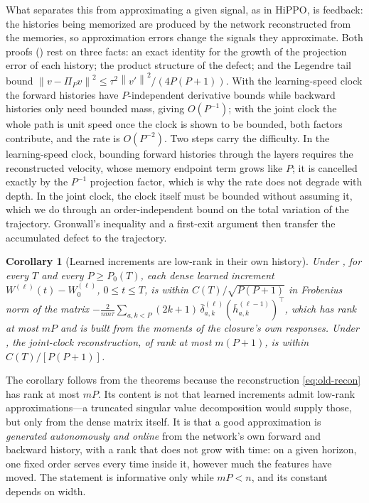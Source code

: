 \documentclass[11pt]{article}
\newtheorem{corollary}[theorem]{Corollary}
\theoremstyle{definition}
\theoremstyle{remark}
\newcommand{\norm}[1]{\left\lVert #1\right\rVert}
\begin{document}
What separates this from approximating a given signal, as in HiPPO, is feedback:
the histories being memorized are produced by the network reconstructed from
the memories, so approximation errors change the signals they approximate.  Both
proofs () rest on three facts: an exact
identity for the growth of the projection error of each history; the product
structure of the defect; and the Legendre tail bound
$\norm{v-\Pi_Pv}^2\le\tau^2\norm{v'}^2/(4P(P+1))$.  With the learning-speed clock
the forward histories have $P$-independent derivative bounds while backward
histories only need bounded mass, giving $O(P^{-1})$; with the joint clock the
whole path is unit speed once the clock is shown to be bounded, both factors
contribute, and the rate is $O(P^{-2})$.  Two steps carry the difficulty.  In
the learning-speed clock, bounding forward histories through the layers
requires the reconstructed velocity, whose memory endpoint term grows like $P$;
it is cancelled exactly by the $P^{-1}$ projection factor, which is why the rate
does not degrade with depth.  In the joint clock, the clock itself must be
bounded without assuming it, which we do through an order-independent bound on
the total variation of the trajectory.  Gronwall's inequality and a first-exit
argument then transfer the accumulated defect to the trajectory.

\begin{corollary}[Learned increments are low-rank in their own history]
\label{cor:rank}
Under , for every $T$ and every $P\ge P_0(T)$, each dense learned
increment $W^{(\ell)}(t)-W^{(\ell)}_0$, $0\le t\le T$, is within
$C(T)/\sqrt{P(P+1)}$ in Frobenius norm of the matrix
$-\frac{2}{nm\tau}\sum_{a,k<P}(2k+1)\,\bar\delta^{(\ell)}_{a,k}(\bar h^{(\ell-1)}_{a,k})^\top$,
which has rank at most $mP$ and is built from the moments of the closure's own
responses.  Under , the joint-clock reconstruction, of rank at most
$m(P+1)$, is within $C(T)/[P(P+1)]$.
\end{corollary}

The corollary follows from the theorems because the reconstruction
\eqref{eq:old-recon} has rank at most $mP$.  Its content is not that learned
increments admit low-rank approximations---a truncated singular value
decomposition would supply those, but only from the dense matrix itself.  It is
that a good approximation is \emph{generated autonomously and online} from the
network's own forward and backward history, with a rank that does not grow
with time: on a given horizon, one fixed order serves every time inside it,
however much the features have moved.  The statement is informative only while
$mP<n$, and its constant depends on width.
\end{document}
